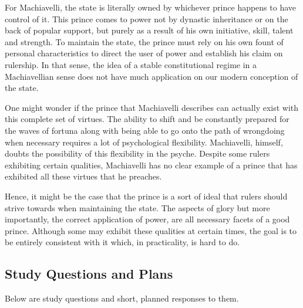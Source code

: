 \documentclass[12pt, letterpaper]{article}
\begin{document}
For Machiavelli, the state is literally owned by whichever prince happens to have control of it. This prince comes to power not by dynastic inheritance or on the back of popular support, but purely as a result of his own initiative, skill, talent and strength. To maintain the state, the prince must rely on his own fount of personal characteristics to direct the user of power and establish his claim on rulership. In that sense, the idea of a stable constitutional regime in a Machiavellian sense does not have much application on our modern conception of the state.

One might wonder if the prince that Machiavelli describes can actually exist with this complete set of virtues. The ability to shift and be constantly prepared for the waves of fortuna along with being able to go onto the path of wrongdoing when necessary requires a lot of psychological flexibility. Machiavelli, himself, doubts the possibility of this flexibility in the psyche. Despite some rulers exhibiting certain qualities, Machiavelli has no clear example of a prince that has exhibited all these virtues that he preaches.

Hence, it might be the case that the prince is a sort of ideal that rulers should strive towards when maintaining the state. The aspects of glory but more importantly, the correct application of power, are all necessary facets of a good prince. Although some may exhibit these qualities at certain times, the goal is to be entirely consistent with it which, in practicality, is hard to do.


\subsection{Study Questions and Plans}
Below are study questions and short, planned responses to them.
\end{document}
